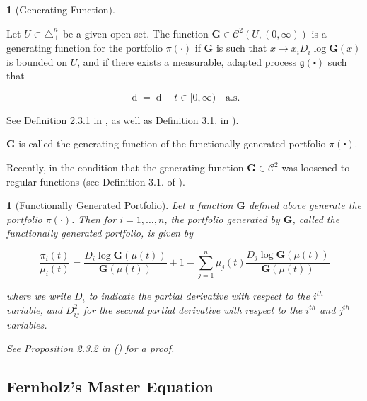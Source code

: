 \documentclass[british]{amsart}
\numberwithin{equation}{section}
\numberwithin{figure}{section}
\theoremstyle{plain}
\theoremstyle{definition}
\newtheorem{defn}[thm]{\protect\definitionname}
\theoremstyle{plain}
\theoremstyle{plain}
\theoremstyle{plain}
\newtheorem{prop}[thm]{\protect\propositionname}
\theoremstyle{remark}
\theoremstyle{plain}
\providecommand{\definitionname}{Definition}
\providecommand{\propositionname}{Proposition}
\renewcommand{\d}[1]{\mathop{\mathrm{d}{#1}}}
\newcommand{\ranget}{t\in[0,\infty)}
\newcommand{\almostsurely}{\text{a.s.}}
\begin{document}
\begin{defn} [Generating Function]
	\label{def:generatingfunction}

	Let $U\subset\triangle_{+}^{n}$ be a given open set. The function $\mathbf{G}\in\mathcal{C}^{2}(U,(0,\infty))$ is a generating function for the portfolio $\pi(\cdot)$ if $\mathbf{G}$ is such that $x\to x_{i}D_{i}\log\mathbf{G}(x)$ is bounded on $U$, and if there exists a measurable, adapted process $\mathfrak{g}(\centerdot)$ such that 

	\begin{equation}
		\d{ \log \left( \frac{V^{\pi}(t)}{V^{\mu}(t)} \right) } = 
		\d{ \log \mathbf{G}(\mu(t)) + \mathfrak{g}(t) }
		\quad \ranget
		\quad \almostsurely
	\end{equation}

See Definition 2.3.1 in \cite{vervuurt2015}, as well as Definition 3.1. in \cite{karatzas1998}). 

$\mathbf{G}$ is called the generating function of the functionally generated portfolio $\pi(\centerdot)$.

\end{defn}

Recently, in \cite{karatzas2017} the condition that the generating function $\mathbf{G}\in\mathcal{C}^{2}$ was loosened to regular functions (see Definition 3.1. of \cite{karatzas2017}).

\begin{prop} [Functionally Generated Portfolio]
	\label{prop:FGP}
	Let a function $\mathbf{G}$ defined above generate the portfolio $\pi(\cdot)$. Then for $i=1,\dots,n$, the portfolio generated by $\mathbf{G}$, called the functionally generated portfolio, is given by

	\begin{equation}
		\frac{\pi_{i}(t)}{\mu_{i}(t)} = 
			\frac{D_{i}\log\mathbf{G}(\mu(t))}{\mathbf{G}(\mu(t))}+1 - 
			\sum_{j=1}^{n} \mu_{j}(t) \frac{D_{j} \log \mathbf{G}(\mu(t))}{\mathbf{G}(\mu(t))}
	\end{equation}

where we write $D_{i}$ to indicate the partial derivative with respect to the $i^{th}$ variable, and $D_{ij}^{2}$ for the second partial derivative with respect to the $i^{th}$ and $j^{th}$ variables. 

	See Proposition 2.3.2 in (\cite{vervuurt2015}) for a proof.
\end{prop}

\newpage

\subsection{Fernholz's Master Equation}
\end{document}
